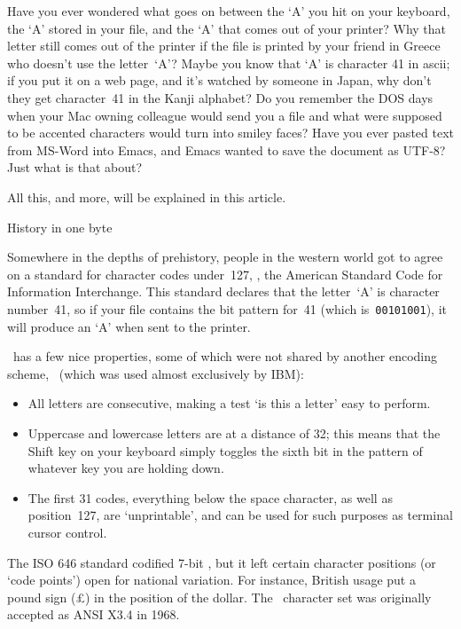 Have you ever wondered what goes on between the `A' you hit on your
keyboard, the `A' stored in your file, and the `A' that comes out of
your printer? Why that letter still comes out of the printer if the
file is printed by your friend in Greece who doesn't use the
letter~`A'? Maybe you know that `A' is character 41 in ascii; if you
put it on a web page, and it's watched by someone in Japan, why don't
they get character~41 in the Kanji alphabet? Do you remember the DOS
days when your Mac owning colleague would send you a file and what
were supposed to be accented characters would turn into smiley faces?
Have you ever pasted text from MS-Word into Emacs, and Emacs wanted to
save the document as UTF-8? Just what is that about?

All this, and more, will be explained in this article.

 {History in one byte}


Somewhere in the depths of prehistory, people in the western world got
to agree on a standard for character codes
under~127, \ascii, the American
Standard Code for Information Interchange.  This standard declares
that the letter~`A' is character number~41, so if your file contains
the bit pattern for~41 (which is~\texttt{00101001}), it will produce an
`A' when sent to the printer.

\ascii\ has a few nice properties, some of which were not shared by
another encoding scheme,
\ebcdic\ (which was used almost exclusively by IBM):
\begin{itemize}
\item All letters are consecutive, making a test `is this a letter'
  easy to perform.
\item Uppercase and lowercase letters are at a distance of 32; this
  means that the Shift key on your keyboard simply toggles the sixth bit in
  the pattern of whatever key you are holding down.
\item The first 31 codes, everything below the space character, as
  well as position~127, are
  `unprintable', and can be used for such
  purposes as terminal cursor control.
\end{itemize}

The ISO 646 standard codified 7-bit \ascii,
but it left certain character positions (or `code
points') open for national variation. For instance, British usage put
a pound sign (\pounds) in the position of the dollar. The
\ascii\ character set was originally accepted as ANSI X3.4 in 1968.

